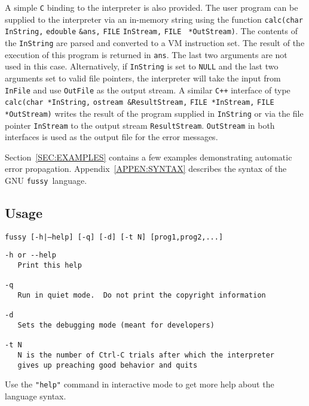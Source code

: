 \documentclass[11pt]{article}
\newcommand{\Fussy}{GNU {\tt fussy}}
\begin{document}
A simple {\tt C} binding to the interpreter is also provided.  The user program can be
supplied to the interpreter via an in-memory string using the function {\tt calc(char}
{\tt *InString,} {\tt edouble} {\tt \&ans,} {\tt FILE} {\tt *InStream,} {\tt FILE} {\tt
  *OutStream)}.  The contents of the {\tt InString} are parsed and converted to a VM
instruction set.  The result of the execution of this program is returned in {\tt ans}.
The last two arguments are not used in this case.  Alternatively, if {\tt InString} is
set to {\tt NULL} and the last two arguments set to valid file pointers, the interpreter
will take the input from {\tt InFile} and use {\tt OutFile} as the output stream.  A
similar {\tt C++} interface of type {\tt calc(}{\tt char *InString,} {\tt ostream
  \&ResultStream,} {\tt FILE *InStream,} {\tt FILE *OutStream)} writes the result of the
program supplied in {\tt InString} or via the file pointer {\tt InStream} to the output
stream {\tt ResultStream}.  {\tt OutStream} in both interfaces is used as the output file
for the error messages.

Section~\ref{SEC:EXAMPLES} contains a few examples demonstrating automatic error
propagation.  Appendix~\ref{APPEN:SYNTAX} describes the syntax of the \Fussy\ language.

\subsection{Usage}
{\tt fussy [-h|--help] [-q] [-d] [-t N] [prog1,prog2,...]}

\begin{verbatim}
-h or --help
   Print this help

-q
   Run in quiet mode.  Do not print the copyright information

-d
   Sets the debugging mode (meant for developers)

-t N
   N is the number of Ctrl-C trials after which the interpreter
   gives up preaching good behavior and quits
\end{verbatim}
Use the {\tt "help"} command in interactive mode to get more help about the language syntax.
\end{document}
